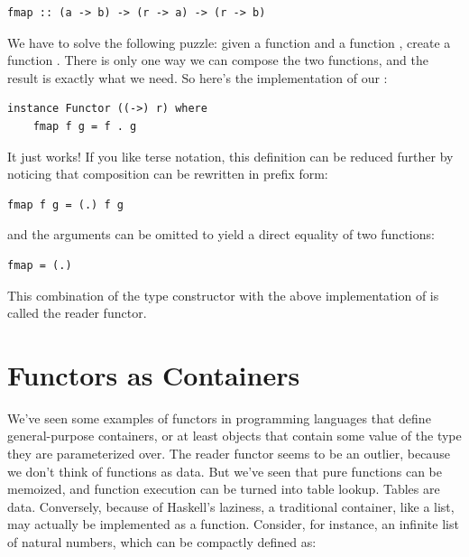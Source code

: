 \begin{Verbatim}[commandchars=\\\{\}]
fmap :: (a -> b) -> (r -> a) -> (r -> b)
\end{Verbatim}
We have to solve the following puzzle: given a function
 and a function
, create a function
. There is only one way we can compose the two
functions, and the result is exactly what we need. So here's the
implementation of our :

\begin{Verbatim}[commandchars=\\\{\}]
instance Functor ((->) r) where
    fmap f g = f . g
\end{Verbatim}
It just works! If you like terse notation, this definition can be
reduced further by noticing that composition can be rewritten in prefix
form:

\begin{Verbatim}[commandchars=\\\{\}]
fmap f g = (.) f g
\end{Verbatim}
and the arguments can be omitted to yield a direct equality of two
functions:

\begin{Verbatim}[commandchars=\\\{\}]
fmap = (.)
\end{Verbatim}
This combination of the type constructor 
with the above implementation of  is called the reader
functor.

\section{Functors as Containers}\label{functors-as-containers}

We've seen some examples of functors in programming languages that
define general-purpose containers, or at least objects that contain some
value of the type they are parameterized over. The reader functor seems
to be an outlier, because we don't think of functions as data. But we've
seen that pure functions can be memoized, and function execution can be
turned into table lookup. Tables are data. Conversely, because of
Haskell's laziness, a traditional container, like a list, may actually
be implemented as a function. Consider, for instance, an infinite list
of natural numbers, which can be compactly defined as:

